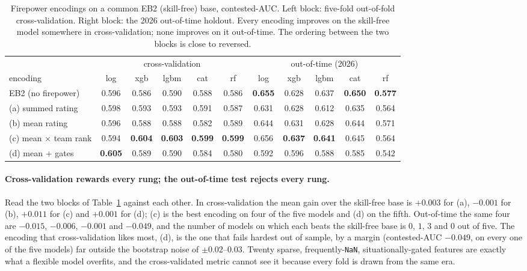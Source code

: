 \documentclass[11pt,a4paper]{article}
\begin{document}
\begin{table}[t]
\centering
\caption{Firepower encodings on a common EB2 (skill-free) base, contested-AUC. Left block:
five-fold out-of-fold cross-validation. Right block: the 2026 out-of-time holdout. Every
encoding improves on the skill-free model somewhere in cross-validation; none improves on it
out-of-time. The ordering between the two blocks is close to reversed.}
\label{tab:fpladder}
\small
\begin{tabular}{lccccc|ccccc}
\toprule
& \multicolumn{5}{c|}{cross-validation} & \multicolumn{5}{c}{out-of-time (2026)} \\
encoding & log & xgb & lgbm & cat & rf & log & xgb & lgbm & cat & rf \\
\midrule
EB2 (no firepower) & 0.596 & 0.586 & 0.590 & 0.588 & 0.586 & \textbf{0.655} & 0.628 & 0.637 & \textbf{0.650} & \textbf{0.577} \\
(a) summed rating & 0.598 & 0.593 & 0.593 & 0.591 & 0.587 & 0.631 & 0.628 & 0.612 & 0.635 & 0.564 \\
(b) mean rating & 0.596 & 0.588 & 0.588 & 0.582 & 0.589 & 0.644 & 0.631 & 0.628 & 0.644 & 0.571 \\
(c) mean $\times$ team rank & 0.594 & \textbf{0.604} & \textbf{0.603} & \textbf{0.599} & \textbf{0.599} & 0.656 & \textbf{0.637} & \textbf{0.641} & 0.645 & 0.564 \\
(d) mean + gates & \textbf{0.605} & 0.589 & 0.590 & 0.584 & 0.580 & 0.592 & 0.596 & 0.588 & 0.585 & 0.542 \\
\bottomrule
\end{tabular}
\end{table}

\paragraph{Cross-validation rewards every rung; the out-of-time test rejects every rung.}
Read the two blocks of Table~\ref{tab:fpladder} against each other. In cross-validation the
mean gain over the skill-free base is $+0.003$ for (a), $-0.001$ for (b), $+0.011$ for (c)
and $+0.001$ for (d); (c) is the best encoding on four of the five models and (d) on the
fifth. Out-of-time the same four are $-0.015$, $-0.006$, $-0.001$ and $-0.049$, and the
number of models on which each beats the skill-free base is $0$, $1$, $3$ and $0$ out of
five. The encoding that cross-validation likes most, (d), is the one that fails hardest out
of sample, by a margin (contested-AUC $-0.049$, on every one of the five models) far outside
the bootstrap noise of $\pm 0.02$--$0.03$. Twenty sparse, frequently-\texttt{NaN},
situationally-gated features are exactly what a flexible model overfits, and the
cross-validated metric cannot see it because every fold is drawn from the same era.
\end{document}
